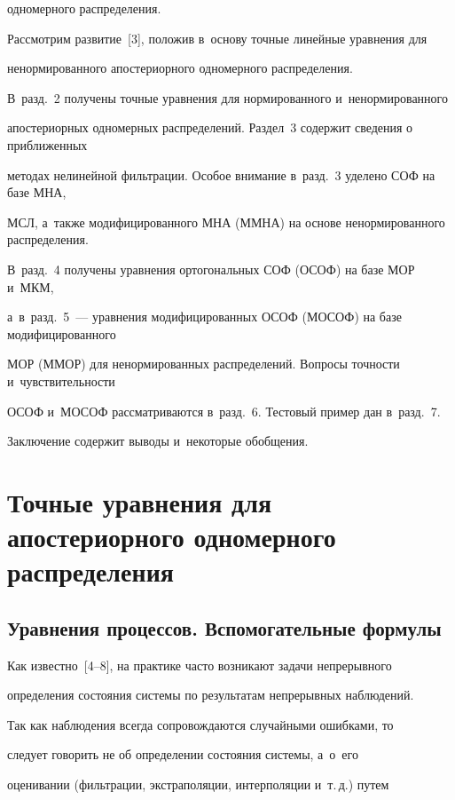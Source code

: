 одномерного распределения.



Рассмотрим развитие~[3], положив в~основу точные линейные уравнения для 

ненормированного апостериорного одномерного распределения.

В~разд.~2 получены точные уравнения для нормированного и~ненормированного 

апостериорных одномерных распределений. Раздел~3 содержит сведения о приближенных 

методах нелинейной фильтрации. Особое внимание в~разд.~3 уделено СОФ на базе МНА, 

МСЛ, а~так\-же модифицированного МНА (ММНА) на основе ненормированного распределения. 

В~разд.~4 получены уравнения ортогональных СОФ (ОСОФ) на базе МОР и~МКМ, 

а~в~разд.~5~--- уравнения модифицированных ОСОФ (МОСОФ) на базе модифицированного 

МОР (ММОР) для ненормированных распределений. Вопросы точности и~чувствительности 

ОСОФ и~МОСОФ рассматриваются в~разд.~6. Тестовый пример дан в~разд.~7. 

Заключение содержит выводы и~некоторые обобщения.





\section{Точные уравнения для апостериорного одномерного распределения}



\subsection{Уравнения процессов. Вспомогательные формулы}



Как известно~[4--8], на практике часто возникают задачи непрерывного

определения состояния системы по результатам непрерывных наблюдений.

Так как наблюдения всегда сопровождаются случайными ошибками, то

следует говорить не об определении состояния системы, а~о~его

оценивании (фильтрации, экстраполяции, интерполяции и~т.\,д.) путем

